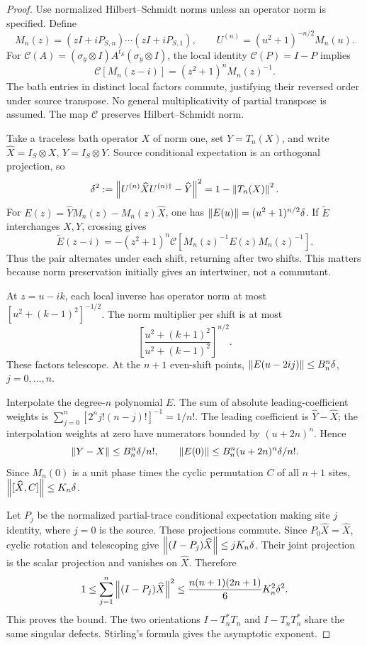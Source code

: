\begin{proof}
Use normalized Hilbert--Schmidt norms unless an operator norm is specified. Define
\[
 M_n(z)=(zI+iP_{S,n})\cdots(zI+iP_{S,1}),\qquad U^{(n)}=(u^2+1)^{-n/2}M_n(u).
\]
For $\mathcal C(A)=(\sigma_y\otimes I)A^{t_S}(\sigma_y\otimes I)$, the local identity $\mathcal C(P)=I-P$ implies
\begin{equation}
 \mathcal C[M_n(z-i)]=(z^2+1)^nM_n(z)^{-1}.\label{eq:cross}
\end{equation}
The bath entries in distinct local factors commute, justifying their reversed order under source transpose. No general multiplicativity of partial transpose is assumed. The map $\mathcal C$ preserves Hilbert--Schmidt norm.

Take a traceless bath operator $X$ of norm one, set $Y=T_n(X)$, and write $\widehat X=I_S\otimes X$, $\widehat Y=I_S\otimes Y$. Source conditional expectation is an orthogonal projection, so
\[
 \delta^2:=\left\lVert U^{(n)}\widehat XU^{(n)\dagger}-\widehat Y\right\rVert^2=1-\left\lVert T_n(X)\right\rVert^2.
\]
For $E(z)=\widehat YM_n(z)-M_n(z)\widehat X$, one has $\left\lVert E(u)\right\rVert=(u^2+1)^{n/2}\delta$. If $\widetilde E$ interchanges $X,Y$, crossing gives
\[
 \widetilde E(z-i)=-(z^2+1)^n\mathcal C[M_n(z)^{-1}E(z)M_n(z)^{-1}].
\]
Thus the pair alternates under each shift, returning after two shifts. This matters because norm preservation initially gives an intertwiner, not a commutant.

At $z=u-ik$, each local inverse has operator norm at most $[u^2+(k-1)^2]^{-1/2}$. The norm multiplier per shift is at most
\[
 \left[\frac{u^2+(k+1)^2}{u^2+(k-1)^2}\right]^{n/2}.
\]
These factors telescope. At the $n+1$ even-shift points, $\left\lVert E(u-2ij)\right\rVert\le B_n^n\delta$, $j=0,\ldots,n$.

Interpolate the degree-$n$ polynomial $E$. The sum of absolute leading-coefficient weights is $\sum_{j=0}^n[2^nj!(n-j)!]^{-1}=1/n!$. The leading coefficient is $\widehat Y-\widehat X$; the interpolation weights at zero have numerators bounded by $(u+2n)^n$. Hence
\[
 \left\lVert Y-X\right\rVert\le B_n^n\delta/n!,\qquad
 \left\lVert E(0)\right\rVert\le B_n^n(u+2n)^n\delta/n!.
\]
Since $M_n(0)$ is a unit phase times the cyclic permutation $C$ of all $n+1$ sites, $\left\lVert[\widehat X,C]\right\rVert\le K_n\delta$.

Let $P_j$ be the normalized partial-trace conditional expectation making site $j$ identity, where $j=0$ is the source. These projections commute. Since $P_0\widehat X=\widehat X$, cyclic rotation and telescoping give $\left\lVert(I-P_j)\widehat X\right\rVert\le jK_n\delta$. Their joint projection is the scalar projection and vanishes on $\widehat X$. Therefore
\[
 1\le\sum_{j=1}^n\left\lVert(I-P_j)\widehat X\right\rVert^2
 \le\frac{n(n+1)(2n+1)}6K_n^2\delta^2.
\]
This proves the bound. The two orientations $I-T_n^*T_n$ and $I-T_nT_n^*$ share the same singular defects. Stirling's formula gives the asymptotic exponent.
\end{proof}

